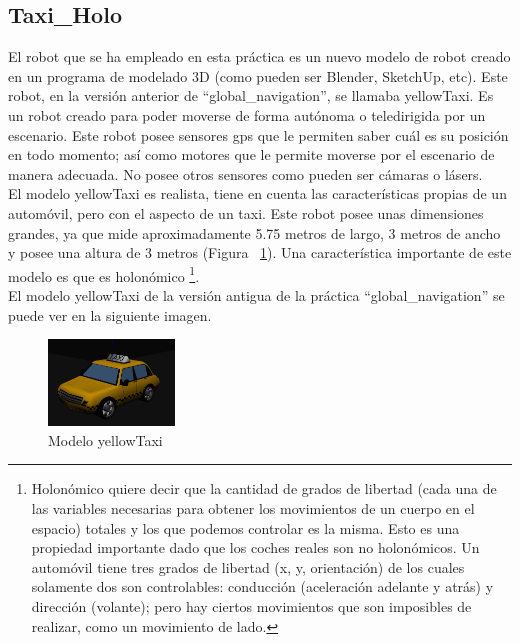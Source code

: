 \subsection{Taxi\_Holo}
El robot que se ha empleado en esta práctica es un nuevo modelo de robot creado en un programa de modelado 3D (como pueden ser Blender, SketchUp, etc). Este robot, en la versión anterior de ``global\_navigation'', se llamaba yellowTaxi. Es un robot creado para poder moverse de forma autónoma o teledirigida por un escenario. Este robot posee sensores \acrshort{gps} que le permiten saber cuál es su posición en todo momento; así como motores que le permite moverse por el escenario de manera adecuada. No posee otros sensores como pueden ser cámaras o lásers.\\

El modelo yellowTaxi es realista, tiene en cuenta las características propias de un automóvil, pero con el aspecto de un taxi. Este robot posee unas dimensiones grandes, ya que mide aproximadamente 5.75 metros de largo, 3 metros de ancho y posee una altura de 3 metros (Figura ~\ref{fig.teleTaxi}).  Una característica importante de este modelo es que es  holonómico \footnote{Holonómico quiere decir que la cantidad de grados de libertad (cada una de las variables necesarias para obtener los movimientos de un cuerpo en el espacio) totales y los que podemos controlar es la misma. Esto es una propiedad importante dado que los coches reales son no holonómicos. Un automóvil tiene tres grados de libertad (x, y, orientación) de los cuales solamente dos son controlables: conducción (aceleración adelante y atrás) y dirección (volante); pero hay ciertos movimientos que son imposibles de realizar, como un movimiento de lado.}.\\

El modelo yellowTaxi de la versión antigua de la práctica ``global\_navigation'' se puede ver en la siguiente imagen.


\begin{figure}[H]
  \begin{center}
    \includegraphics[width=0.3\textwidth]{figures/GPP/gpp_teleTaxi.png}
		\caption{Modelo yellowTaxi}
		\label{fig.teleTaxi}
		\end{center}
\end{figure}

